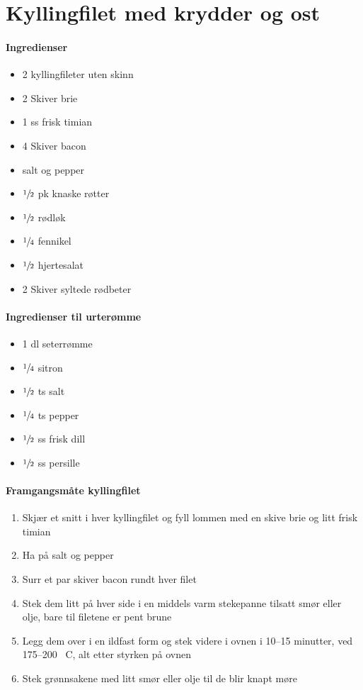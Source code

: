 \section{Kyllingfilet med krydder og ost}


\paragraph{Ingredienser}
\begin{itemize}[noitemsep]
	\item 2 kyllingfileter uten skinn
	\item 2 Skiver  brie
	\item 1 ss frisk timian
	\item 4 Skiver bacon
	\item salt og pepper
	\item $\sfrac{1}{2}$  pk knaske røtter
	\item $\sfrac{1}{2}$  rødløk
	\item $\sfrac{1}{4}$  fennikel
	\item $\sfrac{1}{2}$  hjertesalat
	\item 2 Skiver syltede rødbeter
\end{itemize}

\paragraph{Ingredienser til urterømme}
\begin{itemize}[noitemsep]
	\item 1 dl seterrømme
	\item $\sfrac{1}{4}$  sitron
	\item $\sfrac{1}{2}$  ts salt
	\item $\sfrac{1}{4}$  ts pepper
	\item $\sfrac{1}{2}$  ss frisk dill
	\item $\sfrac{1}{2}$  ss persille
\end{itemize}

\paragraph{Framgangsmåte kyllingfilet}
\begin{enumerate}[noitemsep]
	\item Skjær et snitt i hver kyllingfilet og fyll lommen med en skive brie og litt frisk timian
	\item Ha på salt og pepper
	\item Surr et par skiver bacon rundt hver filet
	\item Stek dem litt på hver side i en middels varm stekepanne tilsatt smør eller olje, bare til filetene er pent brune
	\item Legg dem over i en ildfast form og stek videre i ovnen i 10--15 minutter, ved 175--200 \degree~C, alt etter styrken på ovnen
	\item Stek grønnsakene med litt smør eller olje til de blir knapt møre
\end{enumerate}



